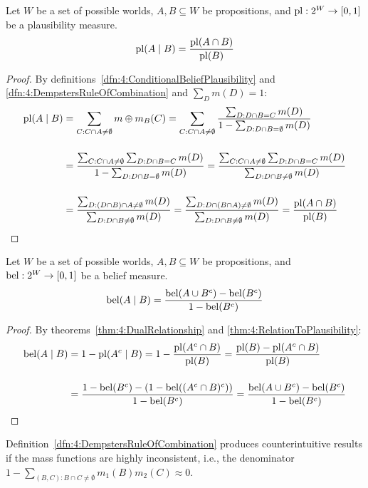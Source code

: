 \begin{thm}
  \label{thm:4:RelationToPlausibility}
  Let $W$ be a set of possible worlds, $A, B \subseteq W$ be propositions, and
  $\operatorname*{pl} : 2^W \to [0, 1]$ be a plausibility measure.
  \begin{equation}
    \label{eqn:4:RelationToPlausibility}
    \operatorname*{pl}(A \mid B) = \frac{\operatorname*{pl}(A \cap B)}{\operatorname*{pl}(B)}
  \end{equation}
  \begin{proof}
    By definitions~\ref{dfn:4:ConditionalBeliefPlausibility} and
    \ref{dfn:4:DempstersRuleOfCombination} and $\sum_D m(D) = 1$:
    \begin{align*}
      \operatorname*{pl}(A \mid B)
       & = \sum_{C : C \cap A \neq \emptyset} m \oplus m_B(C)
      = \sum_{C : C \cap A \neq \emptyset} \frac{\sum_{D : D \cap B = C} m(D)}{1 - \sum_{D : D \cap B = \emptyset} m(D)}
      \\[3ex]
       & = \frac{\sum_{C : C \cap A \neq \emptyset} \sum_{D : D \cap B = C} m(D)}{1 - \sum_{D : D \cap B = \emptyset} m(D)}
      =  \frac{\sum_{C : C \cap A \neq \emptyset} \sum_{D : D \cap B = C} m(D)}{\sum_{D : D \cap B \neq \emptyset} m(D)}
      \\[3ex]
       & = \frac{\sum_{D : (D \cap B) \cap A \neq \emptyset} m(D)}{\sum_{D : D \cap B \neq \emptyset} m(D)}
      = \frac{\sum_{D : D \cap (B \cap A) \neq \emptyset} m(D)}{\sum_{D : D \cap B \neq \emptyset} m(D)}
      = \frac{\operatorname*{pl}(A \cap B)}{\operatorname*{pl}(B)}
    \end{align*}
  \end{proof}
\end{thm}

\begin{thm}
  Let $W$ be a set of possible worlds, $A, B \subseteq W$ be propositions, and
  $\operatorname*{bel} : 2^W \to [0, 1]$ be a belief measure.
  \begin{equation}
    \label{eqn:4:RelationToBelief}
    \operatorname*{bel}(A \mid B) = \frac{\operatorname*{bel}(A \cup B^c) - \operatorname*{bel}(B^c)}{1 - \operatorname*{bel}(B^c)}
  \end{equation}
  \begin{proof}
    By theorems~\ref{thm:4:DualRelationship} and
    \ref{thm:4:RelationToPlausibility}:
    \begin{align*}
      \operatorname*{bel}(A \mid B)
       & = 1 - \operatorname*{pl}(A^c \mid B)
      = 1 - \frac{\operatorname*{pl}(A^c \cap B)}{\operatorname*{pl}(B)}
      = \frac{\operatorname*{pl}(B) - \operatorname*{pl}(A^c \cap B)}{\operatorname*{pl}(B)}
      \\[3ex]
       & = \frac{1 - \operatorname*{bel}(B^c) - (1 - \operatorname*{bel}((A^c \cap B)^c))}{1 - \operatorname*{bel}(B^c)}
      = \frac{\operatorname*{bel}(A \cup B^c) - \operatorname*{bel}(B^c)}{1 - \operatorname*{bel}(B^c)}
    \end{align*}
  \end{proof}
\end{thm}

Definition~\ref{dfn:4:DempstersRuleOfCombination} produces counterintuitive
results if the mass functions are highly inconsistent, i.e., the denominator
$1 - \sum_{(B, C) : B \cap C \neq \emptyset} m_1(B) m_2(C) \approx 0$.